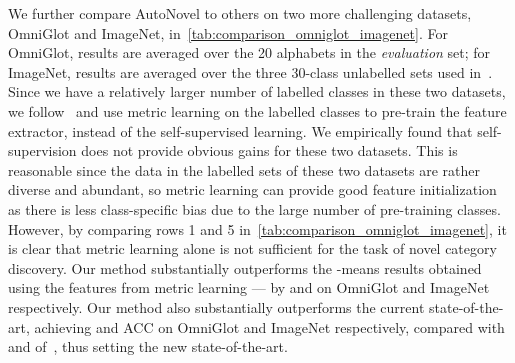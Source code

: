 We further compare AutoNovel to others on two more challenging datasets, OmniGlot and ImageNet, in~\cref{tab:comparison_omniglot_imagenet}.
For OmniGlot, results are averaged over the 20 alphabets in the \emph{evaluation} set; for ImageNet, results are averaged over the three 30-class unlabelled sets used in~\cite{Hsu18_L2C,Hsu19_MCL}.
Since we have a relatively larger number of labelled classes in these two datasets, we follow~\cite{han2019learning} and use metric learning on the labelled classes to pre-train the feature extractor, instead of the self-supervised learning.
We empirically found that self-supervision does not provide obvious gains for these two datasets.
This is reasonable since the data in the labelled sets of these two datasets are rather diverse and abundant, so metric learning can provide good feature initialization as there is less class-specific bias due to the large number of pre-training classes.
However, by comparing rows 1 and 5 in~\cref{tab:comparison_omniglot_imagenet}, it is clear that metric learning alone is not sufficient for the task of novel category discovery.
Our method substantially outperforms the -means results obtained using the features from metric learning --- by  and  on OmniGlot and ImageNet respectively.
Our method also substantially outperforms the current state-of-the-art, achieving  and  ACC on OmniGlot and ImageNet respectively, compared with  and  of~\cite{han2019learning}, thus setting the new state-of-the-art.




